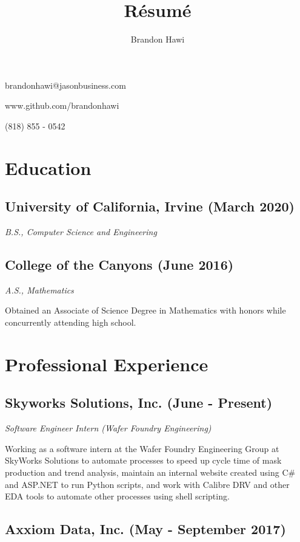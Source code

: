 \documentclass{article}
\makeatletter
\renewcommand{\maketitle}
{
\begin{flushleft}
\huge
\textbf{\theauthor}
\small

brandonhawi@jasonbusiness.com

www.github.com/brandonhawi

(818) 855 - 0542
\end{flushleft}
}
\makeatother
\begin{document}
\title{R\'esum\'e}
\author{Brandon Hawi}

\maketitle
\vspace{-0.1in}
\section{Education}

\subsection{University of California, Irvine (March 2020)}
\noindent\textit{B.S., Computer Science and Engineering}

\subsection{College of the Canyons (June 2016)}
\noindent\textit{A.S., Mathematics}

Obtained an Associate of Science Degree in Mathematics with honors while concurrently attending
high school.

\section{Professional Experience}

%
%
%

\subsection{Skyworks Solutions, Inc. (June - Present)}

\noindent\textit{Software Engineer Intern (Wafer Foundry Engineering)}

Working as a software intern at the Wafer Foundry Engineering Group at SkyWorks Solutions to 
automate processes to speed up cycle time of mask production and trend analysis, maintain an internal website 
created using C\# and ASP.NET to run Python scripts, and work with Calibre DRV and other EDA tools to 
automate other processes using shell scripting.

\subsection{Axxiom Data, Inc. (May - September 2017)}
\end{document}
